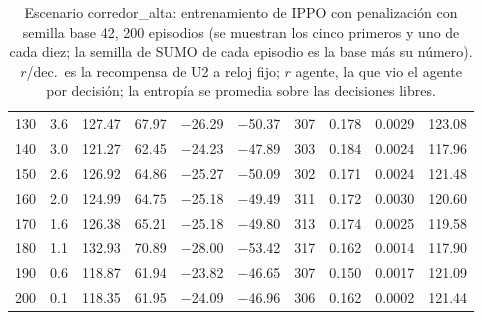 \begin{table}[H]
\begin{tabular}{rrrrrrrrrr}
130 & 3.6 & 127.47 & 67.97 & $-$26.29 & $-$50.37 & 307 & 0.178 & 0.0029 & 123.08 \\
140 & 3.0 & 121.27 & 62.45 & $-$24.23 & $-$47.89 & 303 & 0.184 & 0.0024 & 117.96 \\
150 & 2.6 & 126.92 & 64.86 & $-$25.27 & $-$50.09 & 302 & 0.171 & 0.0024 & 121.48 \\
160 & 2.0 & 124.99 & 64.75 & $-$25.18 & $-$49.49 & 311 & 0.172 & 0.0030 & 120.60 \\
170 & 1.6 & 126.38 & 65.21 & $-$25.18 & $-$49.80 & 313 & 0.174 & 0.0025 & 119.58 \\
180 & 1.1 & 132.93 & 70.89 & $-$28.00 & $-$53.42 & 317 & 0.162 & 0.0014 & 117.90 \\
190 & 0.6 & 118.87 & 61.94 & $-$23.82 & $-$46.65 & 307 & 0.150 & 0.0017 & 121.09 \\
200 & 0.1 & 118.35 & 61.95 & $-$24.09 & $-$46.96 & 306 & 0.162 & 0.0002 & 121.44 \\
\bottomrule
\end{tabular}
\caption[Escenario corredor\_alta: entrenamiento de IPPO con penalización, semilla base 42]{Escenario corredor\_alta: entrenamiento de IPPO con penalización con semilla base 42, 200 episodios (se muestran los cinco primeros y uno de cada diez; la semilla de SUMO de cada episodio es la base más su número). $r$/dec.\ es la recompensa de U2 a reloj fijo; $r$ agente, la que vio el agente por decisión; la entropía se promedia sobre las decisiones libres.}
\label{tab:corredor_alta-ippo-spill-42}
\end{table}


